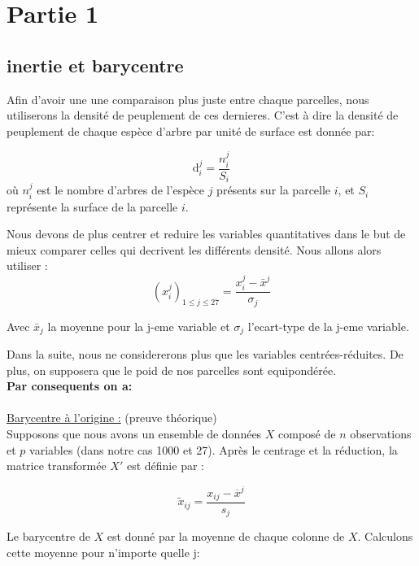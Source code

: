 \documentclass{article}
\begin{document}
\section{Partie 1}
\subsection{inertie et barycentre}

Afin d'avoir une une comparaison plus juste entre chaque parcelles, nous utiliserons la densité de peuplement de ces dernieres. C'est à dire 
la densité de peuplement de chaque espèce d'arbre par unité de surface est donnée par:

\[
\text{d}_i^j = \frac{n_i^j}{S_i}
\]
où \(n_i^j\) est le nombre d'arbres de l'espèce \(j\) présents sur la parcelle \(i\), et \(S_i\) représente la surface de la parcelle \(i\).

\vspace{2\baselineskip}



Nous devons de plus centrer et reduire les variables quantitatives dans le but de mieux comparer celles qui decrivent les différents densité.
Nous allons alors utiliser :
\[
(x_i^j)_{1 \leq j \leq 27} = \frac{x_i^j - \bar{x}^j}{\sigma_j}
\]

Avec $\bar{x}_j$ la moyenne pour la j-eme variable et  $\sigma_j$ l'ecart-type de la j-eme variable.

\vspace{2\baselineskip}

Dans la suite, nous ne considererons plus que les variables centrées-réduites.
De plus, on supposera que le poid de nos parcelles sont equipondérée.
\vspace{2\baselineskip}
\\
\textbf{Par consequents on a:}
\\
\\
\underline{Barycentre à l'origine :} (preuve théorique)
\\

Supposons que nous avons un ensemble de données $X$ composé de $n$ observations et $p$ variables (dans notre cas 1000 et 27). Après le centrage et la réduction, la matrice transformée $X'$ est définie par :

\[
\tilde{x}_{ij} = \frac{x_{ij} - \overline{x}^j}{s_j}
\]

Le barycentre de $X$ est donné par la moyenne de chaque colonne de $X$. Calculons cette moyenne pour n'importe quelle j:
\end{document}

